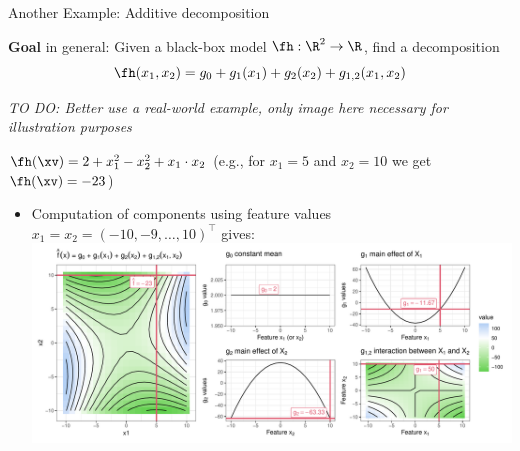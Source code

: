 \documentclass[11pt,compress,t,notes=noshow, aspectratio=169, xcolor=table]{beamer}
\newcommand{\open}{}
\newcommand{\close}{}
\begin{document}



    

\begin{frame}{Another Example: Additive decomposition}

\textbf{Goal} in general:
Given a black-box model \(\fh: \R^2 \to \R\), find a decomposition
\begin{equation}
    \fh(x_1, x_2) =  g_{0} + g_1(x_1) + g_2(x_2) + g_{\open 1, 2 \close}(x_1, x_2)
\end{equation}

\textit{TO DO: Better use a real-world example, only image here necessary for illustration purposes}

\begin{example}
$\fh(\xv) = 2 + x_1^2 - x_2^2 + x_1 \cdot x_2$ (e.g., for $x_1 = 5$ and $x_2 = 10$ we get $\fh(\xv) = -23$)

\begin{itemize}
    \item Computation of components using feature values $x_1 = x_2 = (-10, -9, \ldots, 10)^\top$ gives:
        \includegraphics[width = \textwidth]{figure/decomposition}
\end{itemize}
    
\end{example}
\end{frame}
\end{document}
